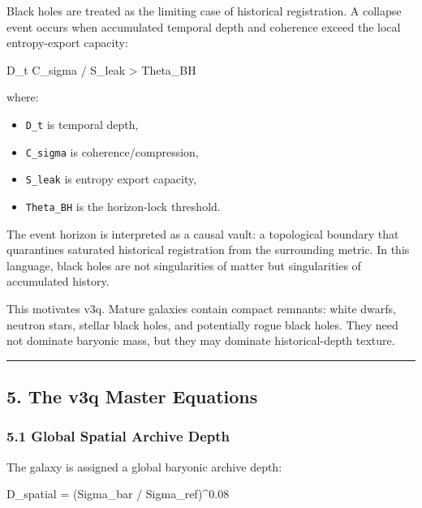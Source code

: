 \documentclass[
]{article}
\newenvironment{Shaded}{}{}
\newcommand{\NormalTok}[1]{#1}
\providecommand{\tightlist}{%
  \setlength{\itemsep}{0pt}\setlength{\parskip}{0pt}}
\begin{document}
Black holes are treated as the limiting case of historical registration.
A collapse event occurs when accumulated temporal depth and coherence
exceed the local entropy-export capacity:

\begin{Shaded}
\begin{Highlighting}[]
\NormalTok{D\_t C\_sigma / S\_leak \textgreater{} Theta\_BH}
\end{Highlighting}
\end{Shaded}

where:

\begin{itemize}
\tightlist
\item
  \texttt{D\_t} is temporal depth,
\item
  \texttt{C\_sigma} is coherence/compression,
\item
  \texttt{S\_leak} is entropy export capacity,
\item
  \texttt{Theta\_BH} is the horizon-lock threshold.
\end{itemize}

The event horizon is interpreted as a causal vault: a topological
boundary that quarantines saturated historical registration from the
surrounding metric. In this language, black holes are not singularities
of matter but singularities of accumulated history.

This motivates v3q. Mature galaxies contain compact remnants: white
dwarfs, neutron stars, stellar black holes, and potentially rogue black
holes. They need not dominate baryonic mass, but they may dominate
historical-depth texture.

\begin{center}\rule{0.5\linewidth}{0.5pt}\end{center}

\subsection{5. The v3q Master Equations}\label{the-v3q-master-equations}

\subsubsection{5.1 Global Spatial Archive
Depth}\label{global-spatial-archive-depth}

The galaxy is assigned a global baryonic archive depth:

\begin{Shaded}
\begin{Highlighting}[]
\NormalTok{D\_spatial = (Sigma\_bar / Sigma\_ref)\^{}0.08}
\end{Highlighting}
\end{Shaded}
\end{document}
